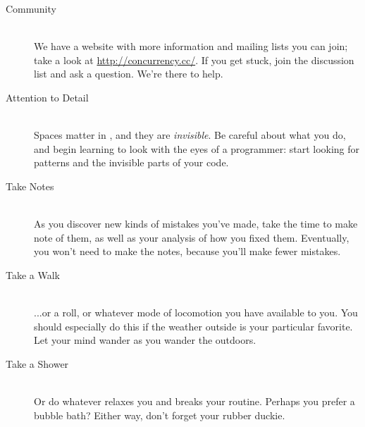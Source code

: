 \begin{description}
	\item[Community]\ \\ We have a website with more information and mailing lists you can join; take a look at \url{http://concurrency.cc/}. If you get stuck, join the discussion list and ask a question. We're there to help.
	\item[Attention to Detail]\ \\ Spaces matter in \plumbing, and they are {\em invisible}. Be careful about what you do, and begin learning to look with the eyes of a programmer: start looking for patterns and the invisible parts of your code.
	\item[Take Notes]\ \\ As you discover new kinds of mistakes you've made, take the time to make note of them, as well as your analysis of how you fixed them. Eventually, you won't need to make the notes, because you'll make fewer mistakes.
	\item[Take a Walk]\ \\ ...or a roll, or whatever mode of locomotion you have available to you. You should especially do this if the weather outside is your particular favorite. Let your mind wander as you wander the outdoors.
	\item[Take a Shower]\ \\ Or do whatever relaxes you and breaks your routine. Perhaps you prefer a bubble bath? Either way, don't forget your rubber duckie.
\end{description}

\newpage

